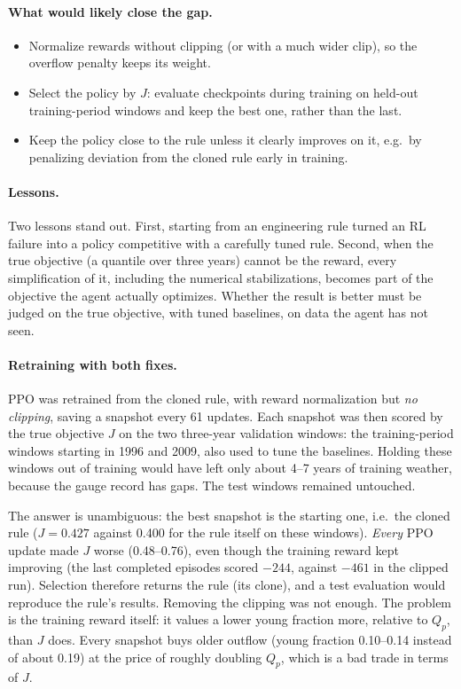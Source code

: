 \paragraph{What would likely close the gap.}
\begin{itemize}\itemsep1pt
\item Normalize rewards without clipping (or with a much wider clip), so
the overflow penalty keeps its weight.
\item Select the policy by $J$: evaluate checkpoints during training on
held-out training-period windows and keep the best one, rather than the
last.
\item Keep the policy close to the rule unless it clearly improves on it,
e.g.\ by penalizing deviation from the cloned rule early in training.
\end{itemize}

\paragraph{Lessons.} Two lessons stand out. First, starting from an
engineering rule turned an RL failure into a policy competitive with a
carefully tuned rule. Second, when the true objective (a quantile over
three years) cannot be the reward, every simplification of it, including
the numerical stabilizations, becomes part of the objective the agent
actually optimizes. Whether the result is better must be judged on the
true objective, with tuned baselines, on data the agent has not seen.

\paragraph{Retraining with both fixes.} PPO was retrained from the cloned
rule, with reward normalization but \emph{no clipping}, saving a snapshot
every 61 updates. Each snapshot was then scored by the true objective $J$
on the two three-year validation windows: the training-period windows
starting in 1996 and 2009, also used to tune the baselines. Holding these
windows out of training would have left only about 4--7 years of training
weather, because the gauge record has gaps. The test windows remained
untouched.
\begin{center}
\small

\end{center}
The answer is unambiguous: the best snapshot is the starting one, i.e.\ the
cloned rule ($J=0.427$ against 0.400 for the rule itself on these windows).
\emph{Every} PPO update made $J$ worse (0.48--0.76), even though the
training reward kept improving (the last completed episodes scored $-244$,
against $-461$ in the clipped run). Selection therefore returns the rule
(its clone), and a test evaluation would reproduce the rule's results.
Removing the clipping was not enough. The problem is the training reward
itself: it values a lower young fraction more, relative to $Q_p$, than $J$
does. Every snapshot buys older outflow (young fraction 0.10--0.14 instead
of about 0.19) at the price of roughly doubling $Q_p$, which is a bad
trade in terms of $J$.

